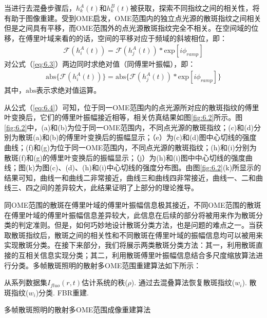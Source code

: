 当进行去混叠步骤后，$h_{k}^{A}(t)$和$h_{k}^{B}(t)$被获取，探索不同指纹之间的相关性，将有助于图像重建。受到OME启发，OME范围内的独立点光源的散斑指纹之间相关但是之间具有平移\cite{Freund1988}，而OME范围外的点光源散斑指纹完全不相关。在空间域的位移，在傅里叶域来看的的话，空间的平移对应于频域的斜坡相位，即：
\begin{equation}
\begin{aligned}
\mathcal{F}(h_i^{A}(t)) = \mathcal{F}(h_j^{A}(t))*\mbox{exp}[i\phi_{ramp}]
\label{eq:6.3}
\end{aligned}
\end{equation} 对公式（\ref{eq:6.3}）两边同时求绝对值（同傅里叶振幅），即：
\begin{equation}
\begin{aligned}
\mbox{abs} \{ \mathcal{F}(h_i^{A}(t)) \} = \mbox{abs} \{  \mathcal{F}(h_j^{A}(t))*\mbox{exp}[i\phi_{ramp}] \}
\label{eq:6.4}
\end{aligned}
\end{equation}其中，$\mbox{abs}$表示求绝对值运算。

从公式（\ref{eq:6.4}）可知，位于同一OME范围内的点光源所对应的散斑指纹的傅里叶变换后，它们的傅里叶振幅接近相等，相关仿真结果如图\ref{fig:6.2}所示。图\ref{fig:6.2}中，(a)和(b)为位于同一OME范围内，不同点光源的散斑指纹；(c)和(d)分别为散斑(a)和(b)的傅里叶变换后的振幅显示；（e）为(c)和(d)图中心切线的强度曲线；(f)和(g)为位于同一OME范围内，不同点光源的散斑指纹；(h)和(i)分别为散斑(f)和(g)的傅里叶变换后的振幅显示；（j）为(h)和(i)图中中心切线的强度曲线；图(k)为图(c)、(d)、(h)和(i)中心切线的强度分布图。由图\ref{fig:6.2}(k)所显示的结果可知，曲线一和曲线二非常接近，曲线三和曲线四非常接近，曲线一、二和曲线三、四之间的差异较大，此结果证明了上部分的理论推导。

同OME范围的散斑在傅里叶域的傅里叶振幅信息极其接近，不同OME范围的散斑在傅里叶域的傅里叶振幅信息差异较大，此信息在后续的部分将被用来作为散斑分类的判定准则。但是，如何巧妙地设计散斑分类方法，也是问题的难点之一。当获取散斑指纹后，散斑之间的相关性和不同散斑在傅里叶域的振幅信息均可以被用来实现散斑分类。在接下来部分，我们将展示两类散斑分类方法：其一，利用散斑直接的互相关信息实现分类；其二，利用散斑傅里叶振幅信息结合多尺度缩放算法进行分类。多帧散斑照明的散射多OME范围重建算法如下所示：

\begin{algorithm2e}[htp]
\DontPrintSemicolon
\SetAlgoLined
{}
从系列数据集$I_{fluo}(r,t)$估计系统的秩($\rho$).\;
通过去混叠算法恢复散斑指纹($w_{i}$).\;
散斑指纹($w_{i}$)分类.\;
FBR重建.\;
\caption{多帧散斑照明的散射多OME范围成像重建算法}
\label{alg:a2}
\end{algorithm2e}

